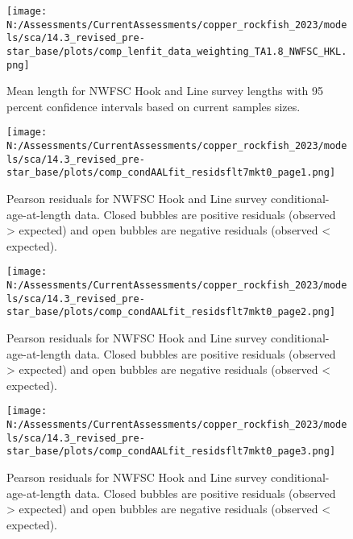 \documentclass[11pt,
  english,
  letterpaper,
]{article}
\begin{document}
\pagebreak

\begin{figure}
\centering
\texttt{[image: N:/Assessments/CurrentAssessments/copper\_rockfish\_2023/models/sca/14.3\_revised\_pre-star\_base/plots/comp\_lenfit\_data\_weighting\_TA1.8\_NWFSC\_HKL.png]}
\caption{Mean length for NWFSC Hook and Line survey lengths with 95 percent confidence intervals based on current samples sizes.\label{fig:nwfsc-hkl-mean-len-fit}}
\end{figure}

\pagebreak

\begin{figure}
\centering
\texttt{[image: N:/Assessments/CurrentAssessments/copper\_rockfish\_2023/models/sca/14.3\_revised\_pre-star\_base/plots/comp\_condAALfit\_residsflt7mkt0\_page1.png]}
\caption{Pearson residuals for NWFSC Hook and Line survey conditional-age-at-length data. Closed bubbles are positive residuals (observed \textgreater{} expected) and open bubbles are negative residuals (observed \textless{} expected).\label{fig:nwfsc-hkl-age-pearson-1}}
\end{figure}

\pagebreak

\begin{figure}
\centering
\texttt{[image: N:/Assessments/CurrentAssessments/copper\_rockfish\_2023/models/sca/14.3\_revised\_pre-star\_base/plots/comp\_condAALfit\_residsflt7mkt0\_page2.png]}
\caption{Pearson residuals for NWFSC Hook and Line survey conditional-age-at-length data. Closed bubbles are positive residuals (observed \textgreater{} expected) and open bubbles are negative residuals (observed \textless{} expected).\label{fig:nwfsc-hkl-age-pearson-2}}
\end{figure}

\pagebreak

\begin{figure}
\centering
\texttt{[image: N:/Assessments/CurrentAssessments/copper\_rockfish\_2023/models/sca/14.3\_revised\_pre-star\_base/plots/comp\_condAALfit\_residsflt7mkt0\_page3.png]}
\caption{Pearson residuals for NWFSC Hook and Line survey conditional-age-at-length data. Closed bubbles are positive residuals (observed \textgreater{} expected) and open bubbles are negative residuals (observed \textless{} expected).\label{fig:nwfsc-hkl-age-pearson-3}}
\end{figure}
\end{document}
